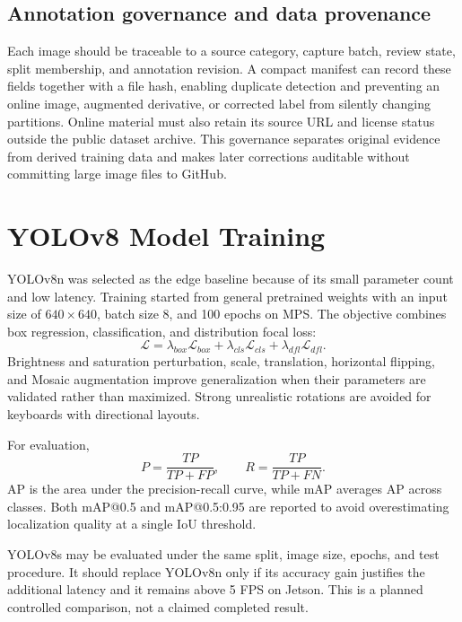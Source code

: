 \documentclass[a4paper,11pt]{article}
\begin{document}
\subsection{Annotation governance and data provenance}
Each image should be traceable to a source category, capture batch, review state, split membership, and annotation revision. A compact manifest can record these fields together with a file hash, enabling duplicate detection and preventing an online image, augmented derivative, or corrected label from silently changing partitions. Online material must also retain its source URL and license status outside the public dataset archive. This governance separates original evidence from derived training data and makes later corrections auditable without committing large image files to GitHub.

\section{YOLOv8 Model Training}
YOLOv8n was selected as the edge baseline because of its small parameter count and low latency. Training started from general pretrained weights with an input size of $640\times640$, batch size 8, and 100 epochs on MPS. The objective combines box regression, classification, and distribution focal loss:
\begin{equation}\mathcal{L}=\lambda_{box}\mathcal{L}_{box}+\lambda_{cls}\mathcal{L}_{cls}+\lambda_{dfl}\mathcal{L}_{dfl}.\end{equation}
Brightness and saturation perturbation, scale, translation, horizontal flipping, and Mosaic augmentation improve generalization when their parameters are validated rather than maximized. Strong unrealistic rotations are avoided for keyboards with directional layouts.

For evaluation,
\begin{equation}P=\frac{TP}{TP+FP},\qquad R=\frac{TP}{TP+FN}.\end{equation}
AP is the area under the precision-recall curve, while mAP averages AP across classes. Both mAP@0.5 and mAP@0.5:0.95 are reported to avoid overestimating localization quality at a single IoU threshold.

YOLOv8s may be evaluated under the same split, image size, epochs, and test procedure. It should replace YOLOv8n only if its accuracy gain justifies the additional latency and it remains above 5 FPS on Jetson. This is a planned controlled comparison, not a claimed completed result.
\end{document}
